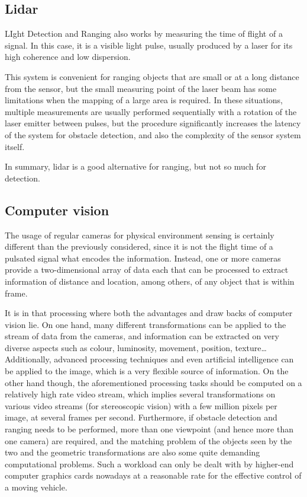 \subsection{Lidar}

LIght Detection and Ranging also works by measuring the time of flight of a signal.
In this case, it is a visible light pulse, usually produced by a laser for its high coherence and low dispersion.

This system is convenient for ranging objects that are small or at a long distance from the sensor, but the small measuring point of the laser beam has some limitations when the mapping of a large area is required.
In these situations, multiple measurements are usually performed sequentially with a rotation of the laser emitter between pulses, but the procedure significantly increases the latency of the system for obstacle detection, and also the complexity of the sensor system itself.

In summary, lidar is a good alternative for ranging, but not so much for detection.

\subsection{Computer vision}

The usage of regular cameras for physical environment sensing is certainly different than the previously considered, since it is not the flight time of a pulsated signal what encodes the information.
Instead, one or more cameras provide a two-dimensional array of data each that can be processed to extract information of distance and location, among others, of any object that is within frame.

It is in that processing where both the advantages and draw backs of computer vision lie.
On one hand, many different transformations can be applied to the stream of data from the cameras, and information can be extracted on very diverse aspects such as colour, luminosity, movement, position, texture\dots \cite{ballard1982}
Additionally, advanced processing techniques and even artificial intelligence can be applied to the image, which is a very flexible source of information.
On the other hand though, the aforementioned processing tasks should be computed on a relatively high rate video stream, which implies several transformations on various video streams (for stereoscopic vision) with a few million pixels per image, at several frames per second.
Furthermore, if obstacle detection and ranging needs to be performed, more than one viewpoint (and hence more than one camera) are required, and the matching problem of the objects seen by the two and the geometric transformations are also some quite demanding computational problems.
Such a workload can only be dealt with by higher-end computer graphics cards nowadays at a reasonable rate for the effective control of a moving vehicle.

